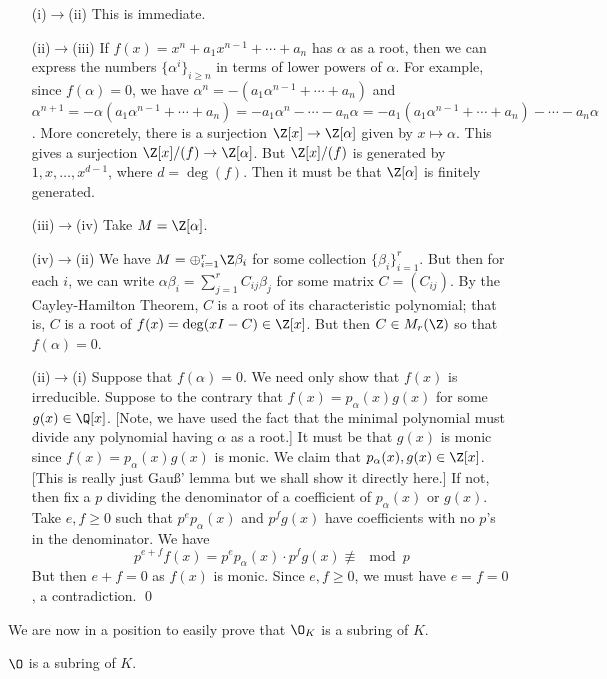 \pf \hfill
\begin{enumerate}
\item[(i)$\to$(ii)] This is immediate.
\item[(ii)$\to$(iii)] If $f(x)=x^n+a_1x^{n-1}+\cdots+a_n$ has $\alpha$ as a root, then we can express the numbers $\{\alpha^i\}_{i \geq n}$ in terms of lower powers of $\alpha$. For example, since $f(\alpha)=0$, we have $\alpha^n= -(a_1\alpha^{n-1}+\cdots+a_n)$ and $\alpha^{n+1}= -\alpha(a_1\alpha^{n-1}+\cdots+a_n)= -a_1\alpha^n-\cdots- a_n\alpha= -a_1(a_1\alpha^{n-1}+\cdots+a_n) - \cdots - a_n \alpha$. More concretely, there is a surjection $\Z[x] \to \Z[\alpha]$ given by $x \mapsto \alpha$. This gives a surjection $\Z[x]/(f) \to \Z[\alpha]$. But $\Z[x]/(f)$ is generated by $1,x,\ldots,x^{d-1}$, where $d=\deg(f)$. Then it must be that $\Z[\alpha]$ is finitely generated. 
\item[(iii)$\to$(iv)] Take $M=\Z[\alpha]$. 
\item[(iv)$\to$(ii)] We have $M=\oplus_{i=1}^r \Z \beta_i$ for some collection $\{\beta_i\}_{i=1}^r$. But then for each $i$, we can write $\alpha \beta_i= \sum_{j=1}^r C_{ij} \beta_j$ for some matrix $C=(C_{ij})$. By the Cayley-Hamilton Theorem, $C$ is a root of its characteristic polynomial; that is, $C$ is a root of $f(x)=\deg(xI-C) \in \Z[x]$. But then $C \in M_r(\Z)$ so that $f(\alpha)=0$. 
\item[(ii)$\to$(i)] Suppose that $f(\alpha)=0$. We need only show that $f(x)$ is irreducible. Suppose to the contrary that $f(x)=p_\alpha(x)g(x)$ for some $g(x) \in \Q[x]$. [Note, we have used the fact that the minimal polynomial must divide any polynomial having $\alpha$ as a root.] It must be that $g(x)$ is monic since $f(x)=p_\alpha(x)g(x)$ is monic. We claim that $p_\alpha(x),g(x) \in \Z[x]$. [This is really just Gau\ss' lemma but we shall show it directly here.] If not, then fix a $p$ dividing the denominator of a coefficient of $p_\alpha(x)$ or $g(x)$. Take $e,f \geq 0$ such that $p^ep_\alpha(x)$ and $p^fg(x)$ have coefficients with no $p$'s in the denominator. We have
	\[
	p^{e+f} f(x) = p^e p_\alpha(x) \cdot p^f g(x) \not\equiv \mod p
	\]
But then $e+f=0$ as $f(x)$ is monic. Since $e,f \geq 0$, we must have $e=f=0$, a contradiction. \qed 
\end{enumerate}

We are now in a position to easily prove that $\O_K$ is a subring of $K$. 

\begin{prop}\label{prop:subring}
$\O$ is a subring of $K$.
\end{prop}

